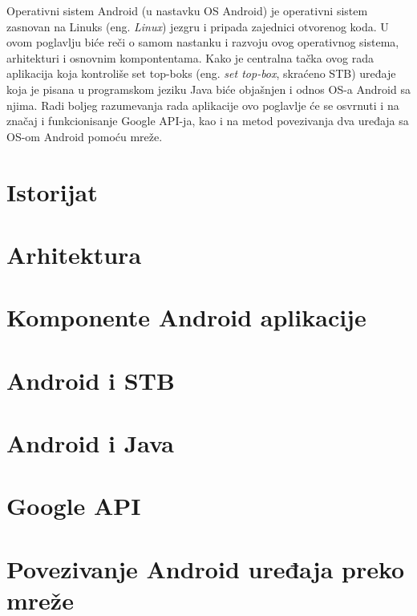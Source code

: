 \documentclass[../TamaraIvanovicMasterRad.tex]{subfiles}
\begin{document}
Operativni sistem Android (u nastavku OS Android) je operativni sistem zasnovan na Linuks (eng. \textit{Linux}) jezgru i pripada zajednici otvorenog koda. U ovom poglavlju biće reči o samom nastanku i razvoju ovog operativnog sistema, arhitekturi i osnovnim kompontentama. Kako je centralna tačka ovog rada aplikacija koja kontroliše set top-boks (eng. \textit{set top-box}, skraćeno STB) uređaje koja je pisana u programskom jeziku Java biće objašnjen i odnos OS-a Android sa njima. Radi boljeg razumevanja rada aplikacije ovo poglavlje će se osvrnuti i na značaj i funkcionisanje Google API-ja, kao i na metod povezivanja dva uređaja sa OS-om Android pomoću mreže. 
\section{Istorijat}



\section{Arhitektura}



\section{Komponente Android aplikacije}


\section{Android i STB}
\section{Android i Java}
\section{Google API}
\section{Povezivanje Android uređaja preko mreže}
\end{document}
